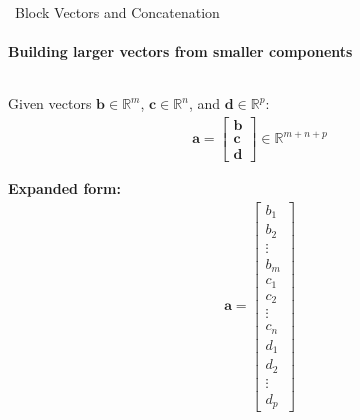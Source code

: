 \documentclass[12pt,aspectratio=169]{beamer}
\begin{document}
\begin{frame}{\faLayerGroup \, Block Vectors and Concatenation}
\framesubtitle{Building larger vectors from smaller components}

\begin{columns}[T]
    \begin{column}{0.6\textwidth}
        \begin{definition}
            Given vectors $\mathbf{b} \in \mathbb{R}^m$, $\mathbf{c} \in \mathbb{R}^n$, and $\mathbf{d} \in \mathbb{R}^p$:
            \begin{align}
                \mathbf{a} = \begin{bmatrix}
                    \mathbf{b} \\
                    \mathbf{c} \\
                    \mathbf{d}
                \end{bmatrix} \in \mathbb{R}^{m+n+p}
            \end{align}
        \end{definition}
        
        \vspace{0.3cm}
        \textbf{Expanded form:}
        \begin{align}
            \mathbf{a} = \begin{bmatrix}
                b_1 \\ b_2 \\ \vdots \\ b_m \\
                c_1 \\ c_2 \\ \vdots \\ c_n \\
                d_1 \\ d_2 \\ \vdots \\ d_p
            \end{bmatrix}
        \end{align}
    \end{column}
    

\end{columns}
\end{frame}
\end{document}
